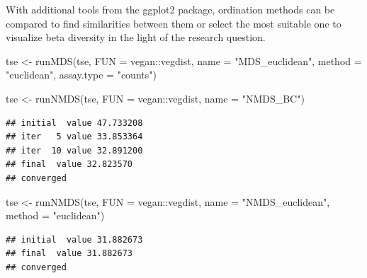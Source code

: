 \documentclass[
]{book}
\newenvironment{Shaded}{\begin{snugshade}}{\end{snugshade}}
\newcommand{\AttributeTok}[1]{\textcolor[rgb]{0.77,0.63,0.00}{#1}}
\newcommand{\FunctionTok}[1]{\textcolor[rgb]{0.00,0.00,0.00}{#1}}
\newcommand{\NormalTok}[1]{#1}
\newcommand{\OtherTok}[1]{\textcolor[rgb]{0.56,0.35,0.01}{#1}}
\newcommand{\SpecialCharTok}[1]{\textcolor[rgb]{0.00,0.00,0.00}{#1}}
\newcommand{\StringTok}[1]{\textcolor[rgb]{0.31,0.60,0.02}{#1}}
\begin{document}
With additional tools from the ggplot2 package, ordination methods can be
compared to find similarities between them or select the most suitable one to
visualize beta diversity in the light of the research question.

\begin{Shaded}
\begin{Highlighting}[]
\NormalTok{tse }\OtherTok{\textless{}{-}} \FunctionTok{runMDS}\NormalTok{(tse,}
              \AttributeTok{FUN =}\NormalTok{ vegan}\SpecialCharTok{::}\NormalTok{vegdist,}
              \AttributeTok{name =} \StringTok{"MDS\_euclidean"}\NormalTok{,}
              \AttributeTok{method =} \StringTok{"euclidean"}\NormalTok{,}
              \AttributeTok{assay.type =} \StringTok{"counts"}\NormalTok{)}

\NormalTok{tse }\OtherTok{\textless{}{-}} \FunctionTok{runNMDS}\NormalTok{(tse,}
               \AttributeTok{FUN =}\NormalTok{ vegan}\SpecialCharTok{::}\NormalTok{vegdist,}
               \AttributeTok{name =} \StringTok{"NMDS\_BC"}\NormalTok{)}
\end{Highlighting}
\end{Shaded}

\begin{verbatim}
## initial  value 47.733208 
## iter   5 value 33.853364
## iter  10 value 32.891200
## final  value 32.823570 
## converged
\end{verbatim}

\begin{Shaded}
\begin{Highlighting}[]
\NormalTok{tse }\OtherTok{\textless{}{-}} \FunctionTok{runNMDS}\NormalTok{(tse,}
               \AttributeTok{FUN =}\NormalTok{ vegan}\SpecialCharTok{::}\NormalTok{vegdist,}
               \AttributeTok{name =} \StringTok{"NMDS\_euclidean"}\NormalTok{,}
               \AttributeTok{method =} \StringTok{"euclidean"}\NormalTok{)}
\end{Highlighting}
\end{Shaded}

\begin{verbatim}
## initial  value 31.882673 
## final  value 31.882673 
## converged
\end{verbatim}
\end{document}
